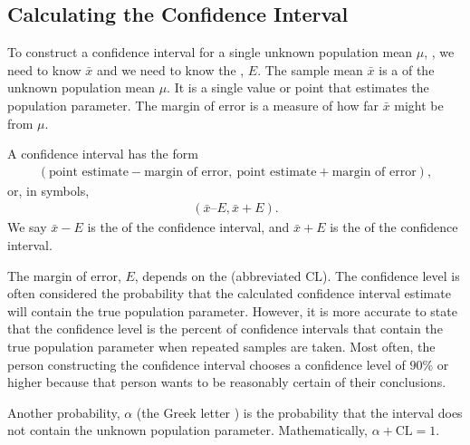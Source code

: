\documentclass[letterpaper,10pt,english]{jupyterBook}
\begin{document}
\subsection{Calculating the Confidence Interval}
\label{\detokenize{Ch5 Confidence Intervals/5.1 Estimating Population Means (Sigma Known):calculating-the-confidence-interval}}
\sphinxAtStartPar
To construct a confidence interval for a single unknown population mean \(\mu\), , we need  to know \(\bar{x}\)  and we need to know the , \(E\). The sample mean \(\bar{x}\)  is a  of the unknown population mean \(\mu\). It is a single value or point that estimates the population parameter. The margin of error is a measure of how far \(\bar{x}\) might be from \(\mu\).

\sphinxAtStartPar
A confidence interval has the form
\begin{equation*}
\begin{split} (\text{point estimate} - \text{margin of error},\ \text{point estimate} + \text{margin of error}), \end{split}
\end{equation*}
\sphinxAtStartPar
or, in symbols,
\begin{equation*}
\begin{split} (\bar{x} – E, \bar{x} + E). \end{split}
\end{equation*}
\sphinxAtStartPar
We say \(\bar{x} - E\) is the  of the confidence interval, and \(\bar{x} + E\) is the  of the confidence interval.

\sphinxAtStartPar
The margin of error, \(E\), depends on the  (abbreviated \(\text{CL}\)). The confidence level is often considered the probability that the calculated confidence interval estimate will contain the true population parameter. However, it is more accurate to state that the confidence level is the percent of confidence intervals that contain the true population parameter when repeated samples are taken. Most often, the person constructing the confidence interval chooses a confidence level of \(90\%\) or higher because that person wants to be reasonably certain of their conclusions.

\sphinxAtStartPar
Another probability, \(\alpha\) (the Greek letter ) is the probability that the interval does not contain the unknown population parameter. Mathematically, \(\alpha + \text{CL} = 1.\)
\end{document}
